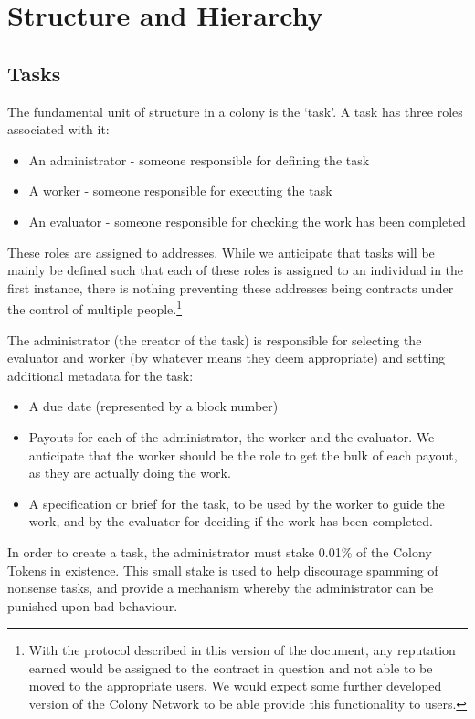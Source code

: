 \section{Structure and Hierarchy}

\subsection{Tasks}

The fundamental unit of structure in a colony is the `task'. A task has three roles associated with it:
\begin{itemize}
\item An administrator - someone responsible for defining the task
\item A worker - someone responsible for executing the task
\item An evaluator - someone responsible for checking the work has been completed
\end{itemize}

These roles are assigned to addresses. While we anticipate that tasks will be mainly be defined such that each of these roles is assigned to an individual in the first instance, there is nothing preventing these addresses being contracts under the control of multiple people.\footnote{With the protocol described in this version of the document, any reputation  earned would be assigned to the contract in question and not able to be moved to the appropriate users. We would expect some further developed version of the Colony Network to be able provide this functionality to users.}

The administrator (the creator of the task) is responsible for selecting the evaluator and worker (by whatever means they deem appropriate) and setting additional metadata for the task:

\begin{itemize}
\item A due date (represented by a block number)
\item Payouts for each of the administrator, the worker and the evaluator. We anticipate that the worker should be the role to get the bulk of each payout, as they are actually doing the work. 
\item A specification or brief for the task, to be used by the worker to guide the work, and by the evaluator for deciding if the work has been completed.
\end{itemize}

In order to create a task, the administrator must stake 0.01\% of the Colony Tokens in existence. This small stake is used to help discourage spamming of nonsense tasks, and provide a mechanism whereby the administrator can be punished upon bad behaviour. 

